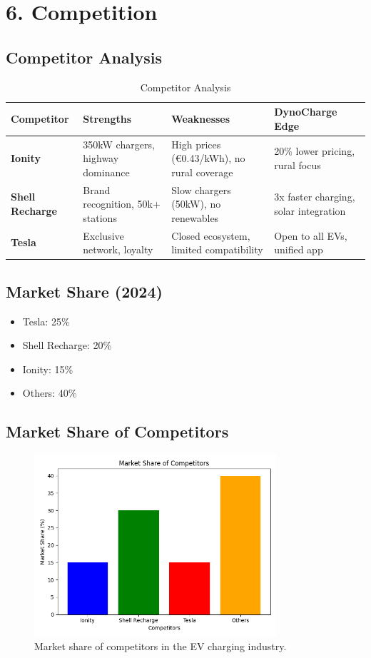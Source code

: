 \section{6. Competition}

\subsection*{Competitor Analysis}
\begin{table}[h!]
    \centering
    \renewcommand{\arraystretch}{1.5}
    \begin{tabular}{|>{\bfseries}m{}|m{}|m{}|m{}|}
    \hline
    \textbf{Competitor} & \textbf{Strengths} & \textbf{Weaknesses} & \textbf{DynoCharge Edge} \\
    \hline
    Ionity & 350kW chargers, highway dominance & High prices (€0.43/kWh), no rural coverage & 20\% lower pricing, rural focus \\
    \hline
    Shell Recharge & Brand recognition, 50k+ stations & Slow chargers (50kW), no renewables & 3x faster charging, solar integration \\
    \hline
    Tesla & Exclusive network, loyalty & Closed ecosystem, limited compatibility & Open to all EVs, unified app \\
    \hline
    \end{tabular}
    \caption{Competitor Analysis}
\end{table}

\subsection*{Market Share (2024)}
\begin{itemize}
    \item Tesla: 25\%
    \item Shell Recharge: 20\%
    \item Ionity: 15\%
    \item Others: 40\%
\end{itemize}

\subsection{Market Share of Competitors}
\begin{figure}[h!]
    \centering
    \includegraphics[width=0.8\textwidth]{images/Marketshare.png}
    \caption{Market share of competitors in the EV charging industry.}
    \label{fig:market_share}
\end{figure}
